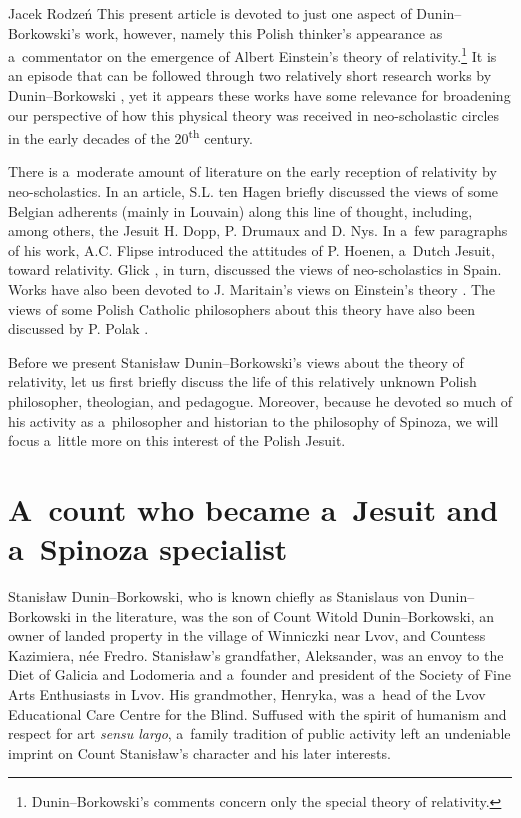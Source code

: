 \begin{artengenv}{Jacek Rodzeń}
This present article is devoted to just one aspect of Dunin–Borkowski's work, however, namely this Polish thinker's appearance as a~commentator on the emergence of Albert Einstein's theory of relativity.\footnote{Dunin–Borkowski's comments concern only the special theory of relativity.} It is an episode that can be followed through two relatively short research works by Dunin–Borkowski
\parencites*[][]{dunin-borkowski_auf_1921}[][]{dunin-borkowski_neue_1921}, %
 yet it appears these works have some relevance for broadening our perspective of how this physical theory was received in neo-scholastic circles in the early decades of the 20\textsuperscript{th} century.

There is a~moderate amount of literature on the early reception of relativity by neo-scholastics. In an article, S.L. ten Hagen
\parencite*[][pp.238–239]{hagen_local_2020} %
 briefly discussed the views of some Belgian adherents (mainly in Louvain) along this line of thought, including, among others, the Jesuit H. Dopp, P. Drumaux and D. Nys. In a~few paragraphs of his work, A.C. Flipse 
\parencite*[][pp.1148–1149]{flipse_between_2010} %
 introduced the attitudes of P. Hoenen, a~Dutch Jesuit, toward relativity. Glick 
\parencite*[][pp.240–242]{glick_relativity_1987}, %
 in turn, discussed the views of neo-scholastics in Spain. Works have also been devoted to J. Maritain's views on Einstein's theory 
\parencites[][pp.161–182]{klosak_z_1980}[][]{wolak_filozofia_1991}. %
 The views of some Polish Catholic philosophers about this theory have also been discussed by P. Polak 
\parencite*[][]{polak_zmagania_2016}.%


Before we present Stanisław Dunin–Borkowski's views about the theory of relativity, let us first briefly discuss the life of this relatively unknown Polish philosopher, theologian, and pedagogue. Moreover, because he devoted so much of his activity as a~philosopher and historian to the philosophy of Spinoza, we will focus a~little more on this interest of the Polish Jesuit.

\section{A~count who became a~Jesuit and a~Spinoza specialist}
Stanisław Dunin–Borkowski, who is known chiefly as Stanislaus von Dunin–Borkowski in the literature, was the son of Count Witold Dunin–Borkowski, an owner of landed property in the village of Winniczki near Lvov, and Countess Kazimiera, née Fredro. Stanisław's grandfather, Aleksander, was an envoy to the Diet of Galicia and Lodomeria and a~founder and president of the Society of Fine Arts Enthusiasts in Lvov. His grandmother, Henryka, was a~head of the Lvov Educational Care Centre for the Blind. Suffused with the spirit of humanism and respect for art \textit{sensu largo}, a~family tradition of public activity left an undeniable imprint on Count Stanisław's character and his later interests.


\end{artengenv}
